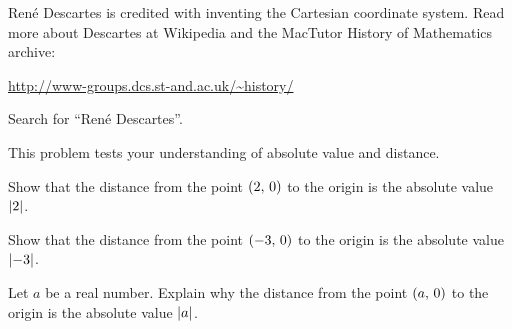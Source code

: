 \documentclass[a4paper,oneside,12pt]{article}
\begin{document}
\begin{problem}
\item Ren\'e Descartes is credited with inventing the Cartesian
  coordinate system.  Read more about Descartes at Wikipedia and the
  MacTutor History of Mathematics archive:
  \begin{center}
  \url{http://www-groups.dcs.st-and.ac.uk/~history/}
  \end{center}
  Search for ``Ren\'e Descartes''.

\item This problem tests your understanding of absolute value and
  distance.
  \begin{packedenum}
  \item\label{subprob:point_on_axis_to_origin_2}
    Show that the distance from the point $\left\lparen{2},\, {0}\right\rparen$ to the origin
    is the absolute value $\lvert2\rvert$.

  \item\label{subprob:point_on_axis_to_origin_minus_3}
    Show that the distance from the point $\left\lparen{-3},\, {0}\right\rparen$ to the
    origin is the absolute value $\lvert-3\rvert$.

  \item\label{subprob:point_on_axis_to_origin_general}
    Let $a$ be a real number.  Explain why the distance from the point
    $\left\lparen{a},\, {0}\right\rparen$ to the origin is the absolute value
    $\lvert a\rvert$.
  \end{packedenum}
\end{problem}
\end{document}
